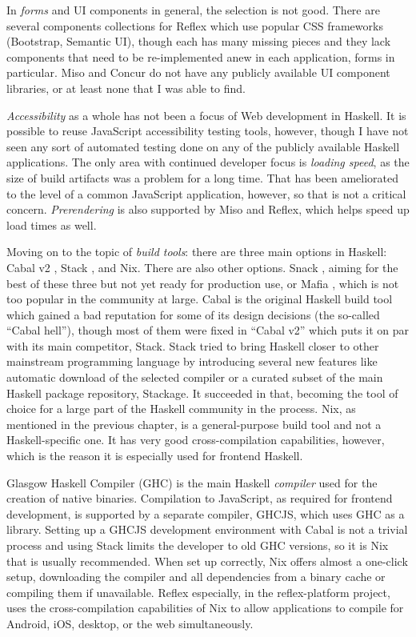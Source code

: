 \documentclass[english,odsaz]{fitthesis}
\begin{document}
In \emph{forms} and UI components in general, the selection is not good. There are
several components collections for Reflex which use popular CSS frameworks
(Bootstrap, Semantic UI), though each has many missing pieces and they lack
components that need to be re-implemented anew in each application, forms in
particular. Miso and Concur do not have any publicly available UI component
libraries, or at least none that I was able to find.

\emph{Accessibility} as a whole has not been a focus of Web development in Haskell. It
is possible to reuse JavaScript accessibility testing tools, however, though I
have not seen any sort of automated testing done on any of the publicly
available Haskell applications. The only area with continued developer focus is
\emph{loading speed}, as the size of build artifacts was a problem for a long
time. That has been ameliorated to the level of a common JavaScript application,
however, so that is not a critical concern. \emph{Prerendering} is also supported by
Miso and Reflex, which helps speed up load times as well.

Moving on to the topic of \emph{build tools}: there are three main options in Haskell:
Cabal v2 \cite{cabal}, Stack \cite{stack}, and Nix. There are also other options.
Snack \cite{snack}, aiming for the best of these three but not yet ready for
production use, or Mafia \cite{mafia}, which is not too popular in the community
at large. Cabal is the original Haskell build tool which gained a bad reputation
for some of its design decisions (the so-called ``Cabal hell''), though most of
them were fixed in ``Cabal v2'' which puts it on par with its main competitor,
Stack. Stack tried to bring Haskell closer to other mainstream programming
language by introducing several new features like automatic download of the
selected compiler or a curated subset of the main Haskell package repository,
Stackage. It succeeded in that, becoming the tool of choice for a large part of
the Haskell community in the process. Nix, as mentioned in the previous chapter,
is a general-purpose build tool and not a Haskell-specific one. It has very good
cross-compilation capabilities, however, which is the reason it is especially
used for frontend Haskell.

Glasgow Haskell Compiler (GHC) is the main Haskell \emph{compiler} used for the
creation of native binaries. Compilation to JavaScript, as required for frontend
development, is supported by a separate compiler, GHCJS, which uses GHC as a
library. Setting up a GHCJS development environment with Cabal is not a trivial
process and using Stack limits the developer to old GHC versions, so it is Nix
that is usually recommended. When set up correctly, Nix offers almost a
one-click setup, downloading the compiler and all dependencies from a binary
cache or compiling them if unavailable. Reflex especially, in the
reflex-platform \cite{reflex-platform} project, uses the cross-compilation
capabilities of Nix to allow applications to compile for Android, iOS, desktop,
or the web simultaneously.
\end{document}
